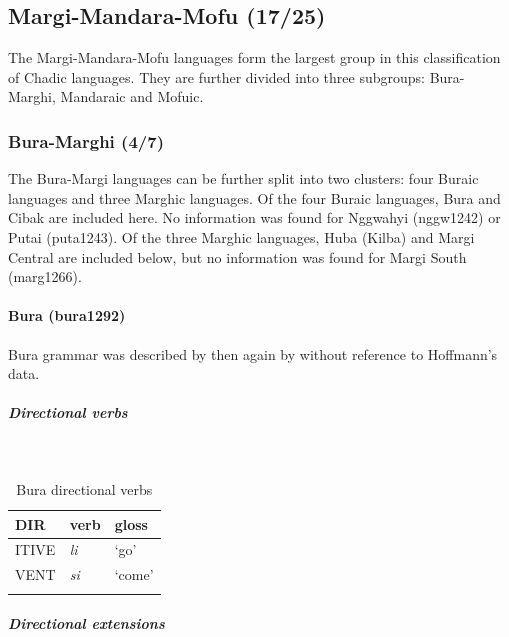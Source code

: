 \subsection{Margi-Mandara-Mofu (17/25)}

The Margi-Mandara-Mofu languages form the largest group in this classification of Chadic languages. They are further divided into three subgroups: Bura-Marghi, Mandaraic and Mofuic. 

\subsubsection{Bura-Marghi (4/7)}

The Bura-Margi languages can be further split into two clusters: four Buraic languages and three Marghic languages. Of the four Buraic languages, Bura and Cibak are included here. No information was found for Nggwahyi (nggw1242) or Putai (puta1243). Of the three Marghic languages, Huba (Kilba) and Margi Central are included below, but no information was found for Margi South (marg1266).

\paragraph*{Bura (bura1292)} \label{bura}

Bura grammar was described by \citet{hoffmannUntersuchungenZurStruktur1955} then again by \citet{blenchBuraVerbalExtensions2010} without reference to Hoffmann's data.

\subparagraph{Directional verbs}~

\begin{table}[H]
	\caption{Bura directional verbs} 
	\label{tab:buraV}
	\begin{tabular}{lll} %
		\lsptoprule
		DIR & verb & gloss   \\ %
		\midrule
		ITIVE & \textit{li} & `go' \\
		VENT & \textit{si} & `come' \\
		\lspbottomrule
	\end{tabular}
\end{table}

\largerpage[2]
\subparagraph{Directional extensions}~

